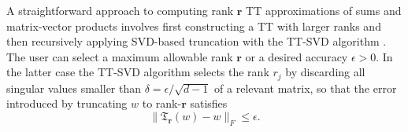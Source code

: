 \documentclass[10pt,preprint]{elsarticle}
\def\T{\mathfrak{T}}
\begin{document}
A straightforward approach to computing rank $\bm r$ TT approximations of sums and matrix-vector products involves first constructing a TT with larger ranks and then recursively applying SVD-based truncation with the 
TT-SVD algorithm \cite{oseledets2011tensor}. The user can select a maximum allowable rank $\bm r$ or a desired accuracy $\epsilon>0$. In the latter case the TT-SVD algorithm selects the rank $r_j$ by discarding all singular values smaller than $\delta = \epsilon/\sqrt{d-1}$ of a relevant matrix, so that the error introduced by truncating $w$ to rank-$\bm r$ satisfies 
\begin{equation} \label{eq:global_trunc_err}
    \|\T_{\bm r}(w) - w\|_F \leq \epsilon. 
\end{equation} 
\end{document}
